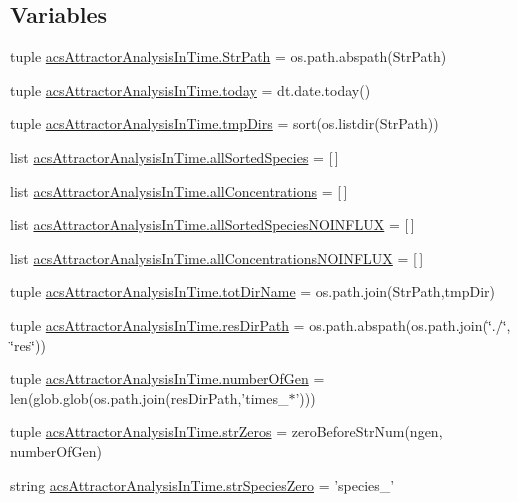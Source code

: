 \subsection*{Variables}
\begin{DoxyCompactItemize}
\item 
tuple \hyperlink{a00097_a1d168f4d444ea1d02f186a7568344fba}{acs\-Attractor\-Analysis\-In\-Time.\-Str\-Path} = os.\-path.\-abspath(Str\-Path)
\item 
tuple \hyperlink{a00097_af30cd903eabfe4c9167f2a5d0062a4ce}{acs\-Attractor\-Analysis\-In\-Time.\-today} = dt.\-date.\-today()
\item 
tuple \hyperlink{a00097_a4f312756a4e405be853b0a84be7e2e54}{acs\-Attractor\-Analysis\-In\-Time.\-tmp\-Dirs} = sort(os.\-listdir(Str\-Path))
\item 
list \hyperlink{a00097_aceddba8afb0eb0cc7ba102491a9a3c30}{acs\-Attractor\-Analysis\-In\-Time.\-all\-Sorted\-Species} = \mbox{[}$\,$\mbox{]}
\item 
list \hyperlink{a00097_a8c439282d32e80d2e2d4c02cc36f1101}{acs\-Attractor\-Analysis\-In\-Time.\-all\-Concentrations} = \mbox{[}$\,$\mbox{]}
\item 
list \hyperlink{a00097_a48013e92108a94a85d1e32c2397eb37c}{acs\-Attractor\-Analysis\-In\-Time.\-all\-Sorted\-Species\-N\-O\-I\-N\-F\-L\-U\-X} = \mbox{[}$\,$\mbox{]}
\item 
list \hyperlink{a00097_af6dd7a5a396717328c091d96d629af7c}{acs\-Attractor\-Analysis\-In\-Time.\-all\-Concentrations\-N\-O\-I\-N\-F\-L\-U\-X} = \mbox{[}$\,$\mbox{]}
\item 
tuple \hyperlink{a00097_aeed4ca0c266fb5e31aebbbbe2f389378}{acs\-Attractor\-Analysis\-In\-Time.\-tot\-Dir\-Name} = os.\-path.\-join(Str\-Path,tmp\-Dir)
\item 
tuple \hyperlink{a00097_a28ca19f0f566396ef664e068a41a2837}{acs\-Attractor\-Analysis\-In\-Time.\-res\-Dir\-Path} = os.\-path.\-abspath(os.\-path.\-join(\char`\"{}./\char`\"{}, \char`\"{}res\char`\"{}))
\item 
tuple \hyperlink{a00097_a28cc280ff54c726bd790cf781d3bab8c}{acs\-Attractor\-Analysis\-In\-Time.\-number\-Of\-Gen} = len(glob.\-glob(os.\-path.\-join(res\-Dir\-Path,'times\-\_\-$\ast$')))
\item 
tuple \hyperlink{a00097_a9401cc8fb642e77e034e21ef9babcb24}{acs\-Attractor\-Analysis\-In\-Time.\-str\-Zeros} = zero\-Before\-Str\-Num(ngen, number\-Of\-Gen)
\item 
string \hyperlink{a00097_aea2d717887265b294c623099d2495d4f}{acs\-Attractor\-Analysis\-In\-Time.\-str\-Species\-Zero} = 'species\-\_\-'

\end{DoxyCompactItemize}
